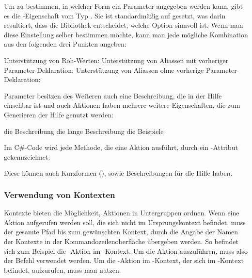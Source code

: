 Um zu bestimmen, in welcher Form ein Parameter angegeben werden kann, gibt es die -Eigenschaft vom Typ .
Sie ist standardmäßig auf  gesetzt, was darin resultiert, dass die Bibliothek entscheidet, welche Option sinnvoll ist.
Wenn man diese Einstellung selber bestimmen möchte, kann man jede mögliche Kombination aus den folgenden drei Punkten angeben:
\begin{outline}
 \1 Unterstützung von Roh-Werten: 
 \1 Unterstützung von Aliassen mit vorheriger Parameter-Deklaration: 
 \1 Unterstützung von Aliassen ohne vorherige Parameter-Deklaration: 
\end{outline}
Parameter besitzen des Weiteren auch eine Beschreibung, die in der Hilfe einsehbar ist und auch Aktionen haben mehrere weitere Eigenschaften,
die zum Generieren der Hilfe genutzt werden:
\begin{outline}
 \1 die Beschreibung
 \1 die lange Beschreibung
 \1 die Beispiele
\end{outline}

Im C\#-Code wird jede Methode, die eine Aktion ausführt, durch ein -Attribut gekennzeichnet.

Diese können auch Kurzformen (), sowie Beschreibungen für die Hilfe haben.

\subsubsection{Verwendung von Kontexten}
Kontexte bieten die Möglichkeit, Aktionen in Untergruppen ordnen.
Wenn eine Aktion aufgerufen werden soll, die sich nicht im Ursprungskontext befindet,
muss der gesamte Pfad bis zum gewünschten Kontext, durch die Angabe der Namen der Kontexte in der Kommandozeilenoberfläche übergeben werden.
So befindet sich zum Beispiel die -Aktion im -Kontext.
Um die Aktion auszuführen, muss also der Befehl  verwendet werden.
Um die -Aktion im -Kontext, der sich im -Kontext befindet,
aufzurufen, muss man  nutzen.

